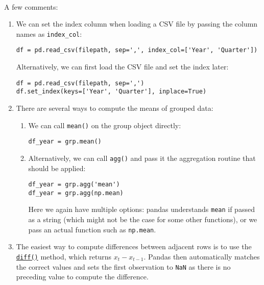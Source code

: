 \documentclass{scrartcl}
\begin{document}
    \begin{center}
    \end{center}
    { \hspace*{\fill} \\}
    
    A few comments:

\begin{enumerate}
\def\labelenumi{\arabic{enumi}.}
\item
  We can set the index column when loading a CSV file by passing the
  column names as \texttt{index\_col}:

\begin{verbatim}
df = pd.read_csv(filepath, sep=',', index_col=['Year', 'Quarter'])
\end{verbatim}

  Alternatively, we can first load the CSV file and set the index later:

\begin{verbatim}
df = pd.read_csv(filepath, sep=',')
df.set_index(keys=['Year', 'Quarter'], inplace=True)
\end{verbatim}
\item
  There are several ways to compute the means of grouped data:

  \begin{enumerate}
  \def\labelenumii{\arabic{enumii}.}
  \item
    We can call \texttt{mean()} on the group object directly:

\begin{verbatim}
df_year = grp.mean()
\end{verbatim}
  \item
    Alternatively, we can call \texttt{agg()} and pass it the
    aggregation routine that should be applied:

\begin{verbatim}
df_year = grp.agg('mean')
df_year = grp.agg(np.mean)
\end{verbatim}

    Here we again have multiple options: pandas understands
    \texttt{\textquotesingle{}mean\textquotesingle{}} if passed as a
    string (which might not be the case for some other functions), or we
    pass an actual function such as \texttt{np.mean}.
  \end{enumerate}
\item
  The easiest way to compute differences between adjacent rows is to use
  the
  \href{https://pandas.pydata.org/pandas-docs/stable/reference/api/pandas.DataFrame.diff.html}{\texttt{diff()}}
  method, which returns \(x_t - x_{t-1}\). Pandas then automatically
  matches the correct values and sets the first observation to
  \texttt{NaN} as there is no preceding value to compute the difference.


\end{enumerate}
\end{document}
